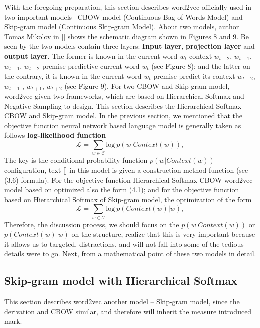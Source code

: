 \documentclass[12pt,a4paper,twoside]{book}
\begin{document}
With the foregoing preparation, this section describes word2vec officially used in two important models --CBOW model (Coutinuous Bag-of-Words Model) and Skip-gram model (Continuous Skip-gram Model). About two models, author Tomas Mikolov in [] shows the schematic diagram shown in Figures 8 and 9.
Be seen by the two models contain three layers: \textbf{Input layer}, \textbf{projection layer}  and \textbf{output layer}. The former is known in the current word $w_t$ context $w_{t-2}$, $w_{t-1}$, $w_{t+1}$, $w_{t+2}$ premise predictive current word $w_t$ (see Figure 8); and the latter on the contrary, it is known in the current word $w_t$ premise predict its context $w_{t-2}$, $w_{t-1}$ , $w_{t+1}$, $w_{t+2}$ (see Figure 9).
For two CBOW and Skip-gram model, word2vec given two frameworks, which are based on Hierarchical Softmax and Negative Sampling to design. This section describes the Hierarchical Softmax CBOW and Skip-gram model.
In the previous section, we mentioned that the objective function neural network based language model is generally taken as follows \textbf{log-likelihood function}
$$\mathcal{L}=\sum_{w\in\mathcal{C}}\mathrm{log}\ p(w|Context(w)), $$
The key is the conditional probability function $p(w|Context(w))$ configuration, text [] in this model is given a construction method function (see (3.6) formula).
For the objective function Hierarchical Softmax CBOW word2vec model based on optimized also the form (4.1); and for the objective function based on Hierarchical Softmax of Skip-gram model, the optimization of the form
$$\mathcal{L}=\sum_{w\in\mathcal{C}}\mathrm{log}\ p(Context(w)|w), $$
Therefore, the discussion process, we should focus on the $p(w|Context(w))$ or $p(Context(w)|w)$ on the structure, realize that this is very important because it allows us to targeted, distractions, and will not fall into some of the tedious details were to go. Next, from a mathematical point of these two models in detail.

\subsection{Skip-gram model with Hierarchical Softmax}
This section describes word2vec another model -- Skip-gram model, since the derivation and CBOW similar, and therefore will inherit the measure introduced mark.
\end{document}
